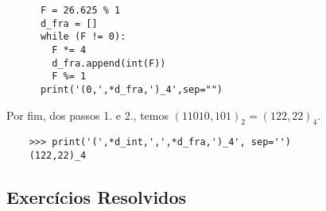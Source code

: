 \begin{ex}
\begin{enumerate}[1.]
    \begin{lstlisting}
      F = 26.625 % 1
      d_fra = []
      while (F != 0):
        F *= 4
        d_fra.append(int(F))
        F %= 1
      print('(0,',*d_fra,')_4',sep="")
    \end{lstlisting}
  \end{enumerate}

  Por fim, dos passos 1. e 2., temos $(11010,101)_2 = (122,22)_4$.

  \begin{lstlisting}
    >>> print('(',*d_int,',',*d_fra,')_4', sep='')
    (122,22)_4
  \end{lstlisting}
\end{ex}

\subsection{Exercícios Resolvidos}

